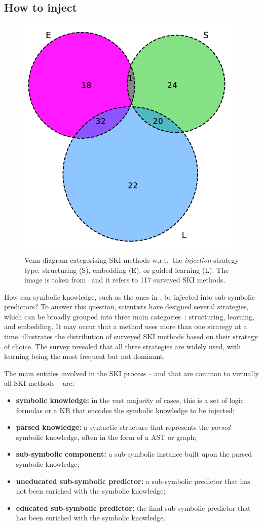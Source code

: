 \subsection{How to inject}\label{subsec:how-to-inject}
%
\begin{figure}
    \centering
    \includegraphics[width=.4\linewidth]{figures/ski-integration}
    \caption[Venn diagram categorising SKI methods]{
        Venn diagram categorising SKI methods w.r.t.\ the \emph{injection} strategy type: structuring (S), embedding (E), or guided learning (L).
        The image is taken from~\cite{DBLP:journals/csur/CiattoSAMO24} and it refers to 117 surveyed \gls{SKI} methods.
    }
    \label{fig:pie-ski-injection}
\end{figure}
%
How can symbolic knowledge, such as the ones in , be injected into sub-symbolic predictors?
%
To answer this question, scientists have designed several strategies, which can be broadly grouped into three main categories~\cite{DBLP:journals/csur/CiattoSAMO24}: structuring, learning, and embedding.
%
It may occur that a method uses more than one strategy at a time.
%
 illustrates the distribution of surveyed \gls{SKI} methods based on their strategy of choice.
%
The survey revealed that all three strategies are widely used, with learning being the most frequent but not dominant.

The main entities involved in the \gls{SKI} process -- and that are common to virtually all \gls{SKI} methods -- are:
%
\begin{itemize}
    \item \textbf{symbolic knowledge:} in the vast majority of cases, this is a set of logic formulas or a \gls{KB} that encodes the symbolic knowledge to be injected;
    \item \textbf{parsed knowledge:} a syntactic structure that represents the \emph{parsed} symbolic knowledge, often in the form of a \gls{AST} or graph;
    \item \textbf{sub-symbolic component:} a sub-symbolic instance built upon the parsed symbolic knowledge;
    \item \textbf{uneducated sub-symbolic predictor:} a sub-symbolic predictor that has not been enriched with the symbolic knowledge;
    \item \textbf{educated sub-symbolic predictor:} the final sub-symbolic predictor that has been enriched with the symbolic knowledge.
\end{itemize}
%


